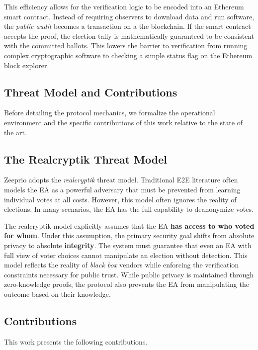 This efficiency allows for the verification logic to be encoded into an
Ethereum smart contract. Instead of requiring observers to download data and
run software, the \emph{public audit} becomes a transaction on a the blockchain. 
If the smart contract accepts the proof, the election tally is mathematically guaranteed to be consistent with the committed ballots. 
This lowers the barrier to verification from running complex cryptographic software to checking a simple status flag on the Ethereum block explorer.

\subsection{Threat Model and Contributions}

Before detailing the protocol mechanics, we formalize the operational environment and the specific contributions of this work relative to the state of the art.

\subsection{The Realcryptik Threat Model}
Zeeprio adopts the \textit{realcryptik} threat model. 
Traditional E2E literature often models the EA as a powerful adversary that must be prevented from learning individual votes at all costs. 
However, this model often ignores the reality of elections. In many scenarios, the EA has the full capability to deanonymize votes.

The realcryptik model explicitly assumes that the EA \textbf{has access to who voted for whom}. Under this assumption, the primary security goal shifts from absolute privacy to absolute \textbf{integrity}. 
The system must guarantee that even an EA with full view of voter choices cannot manipulate an election without detection. This model reflects the reality of \emph{black box} vendors while enforcing the verification constraints necessary for public trust. 
While public privacy is maintained through zero-knowledge proofs, the protocol also prevents the EA from manipulating the outcome based on their knowledge.

\subsection{Contributions}
This work presents the following contributions.

